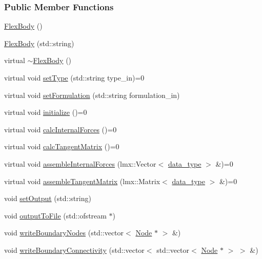 \subsubsection*{Public Member Functions}
\begin{DoxyCompactItemize}
\item 
\hyperlink{classmknix_1_1_flex_body_a55ee3660c2f8d174e938972de2e62d36}{Flex\-Body} ()
\item 
\hyperlink{classmknix_1_1_flex_body_a83a9548bf5422f10ab3753d23c1d2f27}{Flex\-Body} (std\-::string)
\item 
virtual \hyperlink{classmknix_1_1_flex_body_ad5d295b774afc3b265b629a859ea22d1}{$\sim$\-Flex\-Body} ()
\item 
virtual void \hyperlink{classmknix_1_1_flex_body_a0058d01bf9b5b90b22a9f4d6ca0745de}{set\-Type} (std\-::string type\-\_\-in)=0
\item 
virtual void \hyperlink{classmknix_1_1_flex_body_aa079c60afebfc32e1282246cb9045c3a}{set\-Formulation} (std\-::string formulation\-\_\-in)
\item 
virtual void \hyperlink{classmknix_1_1_flex_body_a87ede86c3ade1e700a706c41ce31b2c1}{initialize} ()=0
\item 
virtual void \hyperlink{classmknix_1_1_flex_body_ac7bd6a11a097cd7c540d94e2c1f9d617}{calc\-Internal\-Forces} ()=0
\item 
virtual void \hyperlink{classmknix_1_1_flex_body_a7717a6111a89fa8bf0f52cd0ba77943e}{calc\-Tangent\-Matrix} ()=0
\item 
virtual void \hyperlink{classmknix_1_1_flex_body_a1ceddaab1c7db6fadd4eb8bfd3a30c48}{assemble\-Internal\-Forces} (lmx\-::\-Vector$<$ \hyperlink{namespacemknix_a16be4b246fbf2cceb141e3a179111020}{data\-\_\-type} $>$ \&)=0
\item 
virtual void \hyperlink{classmknix_1_1_flex_body_af661699307694d1dd08b892132416ad7}{assemble\-Tangent\-Matrix} (lmx\-::\-Matrix$<$ \hyperlink{namespacemknix_a16be4b246fbf2cceb141e3a179111020}{data\-\_\-type} $>$ \&)=0
\item 
void \hyperlink{classmknix_1_1_flex_body_ab863f9c782ccffbcea5c5e485fff52bc}{set\-Output} (std\-::string)
\item 
void \hyperlink{classmknix_1_1_flex_body_a1cf57f024248bbb196e91aac9b9ab9fe}{output\-To\-File} (std\-::ofstream $\ast$)
\item 
void \hyperlink{classmknix_1_1_flex_body_a47775d5e09cf56522e914d5d7696a2db}{write\-Boundary\-Nodes} (std\-::vector$<$ \hyperlink{classmknix_1_1_node}{Node} $\ast$ $>$ \&)
\item 
void \hyperlink{classmknix_1_1_flex_body_a96fe50707a8b0c5bbab8c455789d42f5}{write\-Boundary\-Connectivity} (std\-::vector$<$ std\-::vector$<$ \hyperlink{classmknix_1_1_node}{Node} $\ast$ $>$ $>$ \&)
\end{DoxyCompactItemize}
